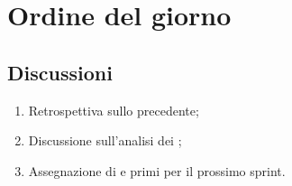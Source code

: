 \section{Ordine del giorno} \label{sec:agenda}
\subsection{Discussioni} \label{subsec:discussione}
\begin{enumerate}
    \item Retrospettiva sullo  precedente;
    \item Discussione sull'analisi dei ;
    \item Assegnazione di  e primi  per il prossimo sprint.
\end{enumerate}
